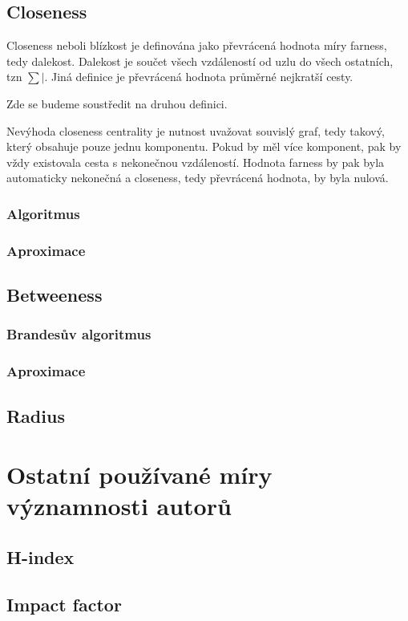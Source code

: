 \documentclass[12pt,titlepage]{report}
\begin{document}
\subsection{Closeness}
Closeness neboli blízkost je definována jako převrácená hodnota míry farness, tedy dalekost. Dalekost je součet všech vzdáleností od uzlu do všech ostatních, tzn $\sum|$. Jiná definice je převrácená hodnota průměrné nejkratší cesty.

Zde se budeme soustředit na druhou definici.

Nevýhoda closeness centrality je nutnost uvažovat souvislý graf, tedy takový,
který obsahuje pouze jednu komponentu. Pokud by měl více komponent, pak by vždy
existovala cesta s nekonečnou vzdáleností. Hodnota farness by pak byla
automaticky nekonečná a closeness, tedy převrácená hodnota, by byla nulová.



\subsubsection{Algoritmus}
\subsubsection{Aproximace}
\subsection{Betweeness}
\subsubsection{Brandesův algoritmus}
\subsubsection{Aproximace}
\subsection{Radius}

\section{Ostatní používané míry významnosti autorů}
\subsection{H-index}
\subsection{Impact factor}
\end{document}
